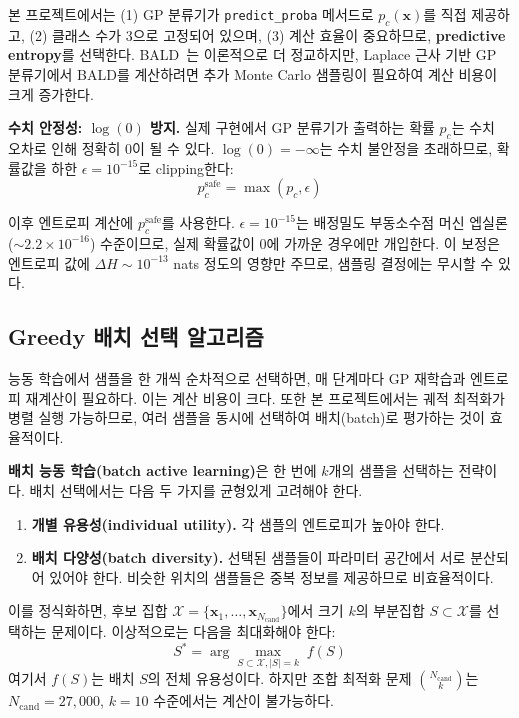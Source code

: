 \documentclass[11pt]{article}
\begin{document}
본 프로젝트에서는 (1) GP 분류기가 \texttt{predict\_proba} 메서드로 $p_c(\mathbf{x})$를 직접 제공하고, (2) 클래스 수가 3으로 고정되어 있으며, (3) 계산 효율이 중요하므로, \textbf{predictive entropy}를 선택한다. BALD~\cite{Houlsby2011}는 이론적으로 더 정교하지만, Laplace 근사 기반 GP 분류기에서 BALD를 계산하려면 추가 Monte Carlo 샘플링이 필요하여 계산 비용이 크게 증가한다.

\textbf{수치 안정성: $\log(0)$ 방지.} 실제 구현에서 GP 분류기가 출력하는 확률 $p_c$는 수치 오차로 인해 정확히 0이 될 수 있다. $\log(0) = -\infty$는 수치 불안정을 초래하므로, 확률값을 하한 $\epsilon = 10^{-15}$로 clipping한다:
\begin{equation}\label{eq:safe-clipping}
p_c^{\text{safe}} = \max(p_c, \epsilon)
\end{equation}

이후 엔트로피 계산에 $p_c^{\text{safe}}$를 사용한다. $\epsilon = 10^{-15}$는 배정밀도 부동소수점 머신 엡실론($\sim 2.2 \times 10^{-16}$) 수준이므로, 실제 확률값이 0에 가까운 경우에만 개입한다. 이 보정은 엔트로피 값에 $\Delta H \sim 10^{-13}$ nats 정도의 영향만 주므로, 샘플링 결정에는 무시할 수 있다.


\subsection{Greedy 배치 선택 알고리즘}

능동 학습에서 샘플을 한 개씩 순차적으로 선택하면, 매 단계마다 GP 재학습과 엔트로피 재계산이 필요하다. 이는 계산 비용이 크다. 또한 본 프로젝트에서는 궤적 최적화가 병렬 실행 가능하므로, 여러 샘플을 동시에 선택하여 배치(batch)로 평가하는 것이 효율적이다.

\textbf{배치 능동 학습(batch active learning)}은 한 번에 $k$개의 샘플을 선택하는 전략이다. 배치 선택에서는 다음 두 가지를 균형있게 고려해야 한다.

\begin{enumerate}[label=\arabic*.]
  \item \textbf{개별 유용성(individual utility).} 각 샘플의 엔트로피가 높아야 한다.
  \item \textbf{배치 다양성(batch diversity).} 선택된 샘플들이 파라미터 공간에서 서로 분산되어 있어야 한다. 비슷한 위치의 샘플들은 중복 정보를 제공하므로 비효율적이다.
\end{enumerate}

이를 정식화하면, 후보 집합 $\mathcal{X} = \{\mathbf{x}_1, \dots, \mathbf{x}_{N_{\text{cand}}}\}$에서 크기 $k$의 부분집합 $S \subset \mathcal{X}$를 선택하는 문제이다. 이상적으로는 다음을 최대화해야 한다:
\begin{equation}\label{eq:batch-opt}
S^* = \arg\max_{S \subset \mathcal{X}, |S| = k} \; f(S)
\end{equation}
여기서 $f(S)$는 배치 $S$의 전체 유용성이다. 하지만 조합 최적화 문제 $\binom{N_{\text{cand}}}{k}$는 $N_{\text{cand}} = 27{,}000$, $k = 10$ 수준에서는 계산이 불가능하다.
\end{document}
